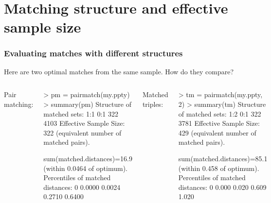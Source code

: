 \section{Matching structure and effective sample size}
\begin{frame}[fragile]
\frametitle{Evaluating matches with different structures}

Here are two optimal matches from the same sample.  How do they compare?

  \begin{columns}
{
  \begin{center}
{    Pair matching: }
  \end{center}
{\footnotesize
    \begin{semiverbatim}
> pm = pairmatch(my.ppty)
> summary(pm)
Structure of matched sets:
 1:1  0:1
 322 4103
Effective Sample Size:  322
(equivalent number of matched pairs).

sum(matched.distances)=16.9
(within 0.0464 of optimum).
Percentiles of matched distances:
    0%
0.0000 0.0024 0.2710 0.6400
    \end{semiverbatim}
}
}
{
  \begin{center}
    { Matched triples:}
  \end{center}
{\footnotesize
\begin{semiverbatim}
> tm = pairmatch(my.ppty, 2)
> summary(tm)
Structure of matched sets:
 1:2  0:1
 322 3781
Effective Sample Size:  429
(equivalent number of matched pairs).

sum(matched.distances)=85.1
(within {0.458} of optimum).
Percentiles of matched distances:
   0%
0.000 0.020 0.609 1.020
\end{semiverbatim}
}
}
\end{columns}

\end{frame}

